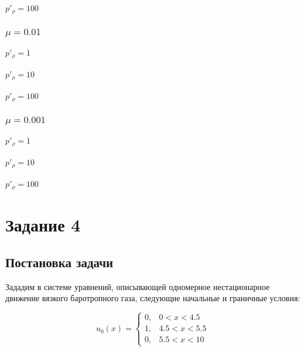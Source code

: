 \documentclass[12pt]{article}
\begin{document}
\paragraph{$p'_{\rho} = 100$}
\subsubsection{$\mu = 0.01$}
\paragraph{$p'_{\rho} = 1$}
\paragraph{$p'_{\rho} = 10$}
\paragraph{$p'_{\rho} = 100$}
\subsubsection{$\mu = 0.001$}
\paragraph{$p'_{\rho} = 1$}
\paragraph{$p'_{\rho} = 10$}
\paragraph{$p'_{\rho} = 100$}

\section{Задание 4}

\subsection{Постановка задачи}

Зададим в системе уравнений, описывающей одномерное нестационарное движение вязкого баротропного газа, следующие начальные и граничные условия:

$$
u_0(x) = 
\begin{cases}
0{,} & 0 < x < 4.5 \\
1{,} & 4.5 < x < 5.5\\
0{,} & 5.5 < x < 10
\end{cases}
$$
\end{document}
